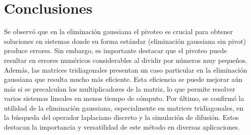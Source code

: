 \section{Conclusiones}
Se observó que en la eliminación gaussiana el pivoteo es crucial para obtener soluciones en sistemas donde su forma estándar (eliminación gaussiana sin pivot) produce errores. Sin embargo, es importante destacar que el pivoteo puede resultar en errores numéricos considerables al dividir por números muy pequeños. 
Además, las matrices tridiagonales presentan un caso particular en la eliminación gaussiana que resulta mucho más eficiente. Esta eficiencia se puede mejorar aún más si se precalculan los multiplicadores de la matriz, lo que permite resolver varios sistemas lineales en menos tiempo de cómputo.
Por último, se confirmó la utilidad de la eliminación gaussiana, especialmente en matrices tridiagonales, en la búsqueda del operador laplaciano discreto y la simulación de difusión. Estos destacan la importancia y versatilidad de este método en diversas aplicaciones.